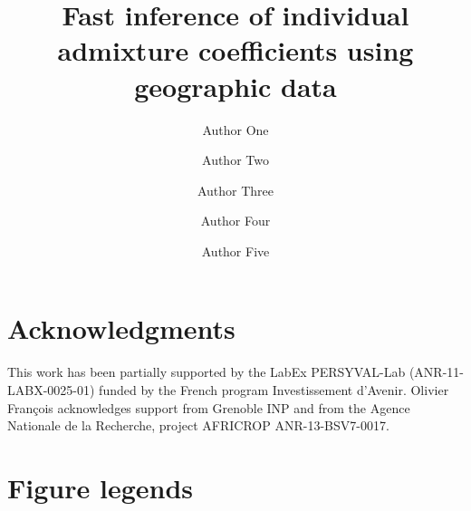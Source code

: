 \documentclass[12pt,lineno]{gsajnl}
\title{Fast inference of individual admixture coefficients using geographic data}
\author[$\ast$,1]{Author One}
\author[$\dagger$]{Author Two}
\author[$\ddagger$]{Author Three}
\author[$\S$]{Author Four}
\author[$\ast\ast$]{Author Five}
\affil[$\ast$]{Author one affiliation}
\affil[$\dagger$]{Author two affiliation}
\affil[$\ddagger$]{Author three affiliation}
\affil[$\S$]{Author four affiliation}
\affil[$\ast\ast$]{Author five affiliation}
\begin{document}
\baselineskip 0.8cm

\maketitle
\thispagestyle{firststyle}
\marginmark
\firstpagefootnote
{}
\vspace{-11pt}%






\section*{Acknowledgments} 

This work has been partially supported by the LabEx PERSYVAL-Lab (ANR-11-LABX-0025-01) funded by the French program
Investissement d\rq{}Avenir. Olivier Fran\c cois acknowledges support from Grenoble INP and from the Agence Nationale de la Recherche, project AFRICROP ANR-13-BSV7-0017.

\newpage 







\clearpage
\newpage






\clearpage
\newpage

\section*{Figure legends}



\vspace{1cm}

\end{document}
